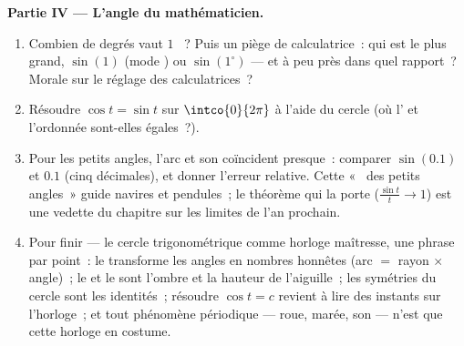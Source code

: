 \begin{problem}
\medskip
\noindent\textbf{Partie IV --- L'angle du mathématicien.}
\begin{enumerate}[resume]
  \item Combien de degrés vaut $1$ ~? Puis un piège de
        calculatrice~: qui est le plus grand, $\sin(1)$ (mode
        ) ou $\sin(1^\circ)$ --- et à peu près dans quel
        rapport~? Morale sur le réglage des calculatrices~?
  \item Résoudre $\cos t = \sin t$ sur $\intco{0}{2\pi}$ à l'aide
        du cercle (où l' et l'ordonnée sont-elles
        égales~?).
  \item Pour les petits angles, l'arc et son  coïncident
        presque~: comparer $\sin(0.1)$ et $0.1$ (cinq décimales),
        et donner l'erreur relative. Cette
        «~ des petits angles~» guide navires et
        pendules~; le théorème qui la porte
        ($\frac{\sin t}{t} \to 1$) est une vedette du chapitre sur
        les limites de l'an prochain.
  \item Pour finir --- le cercle trigonométrique comme horloge
        maîtresse, une phrase par point~: le  transforme les
        angles en nombres honnêtes (arc $=$ rayon $\times$ angle)~;
        le  et le  sont l'ombre et la hauteur de
        l'aiguille~; les symétries du cercle sont les identités~;
        résoudre $\cos t = c$ revient à lire des instants sur
        l'horloge~; et tout phénomène périodique --- roue, marée,
        son --- n'est que cette horloge en costume.
\end{enumerate}
\end{problem}
